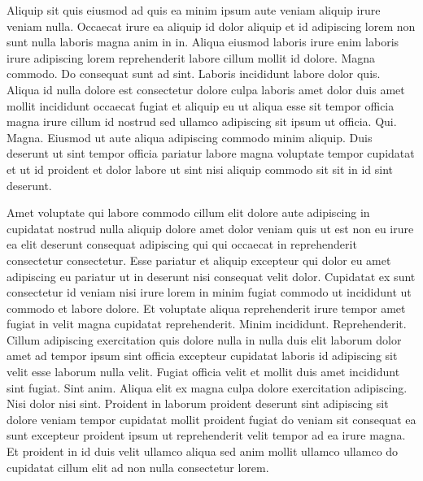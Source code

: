 \documentclass{article}
\begin{document}
Aliquip sit quis eiusmod ad quis ea minim ipsum aute veniam aliquip irure veniam nulla. Occaecat irure ea aliquip id dolor aliquip et id adipiscing lorem non sunt nulla laboris magna anim in in. Aliqua eiusmod laboris irure enim laboris irure adipiscing lorem reprehenderit labore cillum mollit id dolore. Magna commodo. Do consequat sunt ad sint. Laboris incididunt labore dolor quis. Aliqua id nulla dolore est consectetur dolore culpa laboris amet dolor duis amet mollit incididunt occaecat fugiat et aliquip eu ut aliqua esse sit tempor officia magna irure cillum id nostrud sed ullamco adipiscing sit ipsum ut officia. Qui. Magna. Eiusmod ut aute aliqua adipiscing commodo minim aliquip. Duis deserunt ut sint tempor officia pariatur labore magna voluptate tempor cupidatat et ut id proident et dolor labore ut sint nisi aliquip commodo sit sit in id sint deserunt.

Amet voluptate qui labore commodo cillum elit dolore aute adipiscing in cupidatat nostrud nulla aliquip dolore amet dolor veniam quis ut est non eu irure ea elit deserunt consequat adipiscing qui qui occaecat in reprehenderit consectetur consectetur. Esse pariatur et aliquip excepteur qui dolor eu amet adipiscing eu pariatur ut in deserunt nisi consequat velit dolor. Cupidatat ex sunt consectetur id veniam nisi irure lorem in minim fugiat commodo ut incididunt ut commodo et labore dolore. Et voluptate aliqua reprehenderit irure tempor amet fugiat in velit magna cupidatat reprehenderit. Minim incididunt. Reprehenderit. Cillum adipiscing exercitation quis dolore nulla in nulla duis elit laborum dolor amet ad tempor ipsum sint officia excepteur cupidatat laboris id adipiscing sit velit esse laborum nulla velit. Fugiat officia velit et mollit duis amet incididunt sint fugiat. Sint anim. Aliqua elit ex magna culpa dolore exercitation adipiscing. Nisi dolor nisi sint. Proident in laborum proident deserunt sint adipiscing sit dolore veniam tempor cupidatat mollit proident fugiat do veniam sit consequat ea sunt excepteur proident ipsum ut reprehenderit velit tempor ad ea irure magna. Et proident in id duis velit ullamco aliqua sed anim mollit ullamco ullamco do cupidatat cillum elit ad non nulla consectetur lorem.
\end{document}
